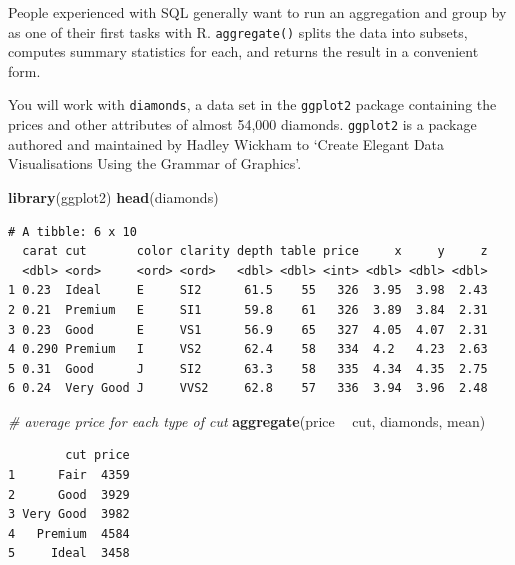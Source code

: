 \documentclass[
]{book}
\newenvironment{Shaded}{\begin{snugshade}}{\end{snugshade}}
\newcommand{\CommentTok}[1]{\textcolor[rgb]{0.56,0.35,0.01}{\textit{#1}}}
\newcommand{\KeywordTok}[1]{\textcolor[rgb]{0.13,0.29,0.53}{\textbf{#1}}}
\newcommand{\NormalTok}[1]{#1}
\newcommand{\OperatorTok}[1]{\textcolor[rgb]{0.81,0.36,0.00}{\textbf{#1}}}
\newcommand{\StringTok}[1]{\textcolor[rgb]{0.31,0.60,0.02}{#1}}
\begin{document}
People experienced with SQL generally want to run an aggregation and
group by as one of their first tasks with R. \texttt{aggregate()} splits the data into subsets, computes summary statistics for each, and returns the result in a convenient form.

You will work with \texttt{diamonds}, a data set in the \texttt{ggplot2} package containing the prices and other attributes of almost 54,000 diamonds. \texttt{ggplot2} is a package authored and maintained by Hadley Wickham to `Create Elegant Data Visualisations Using the Grammar of Graphics'.

\begin{Shaded}
\begin{Highlighting}[]
\KeywordTok{library}\NormalTok{(ggplot2)}
\KeywordTok{head}\NormalTok{(diamonds)}
\end{Highlighting}
\end{Shaded}

\begin{verbatim}
# A tibble: 6 x 10
  carat cut       color clarity depth table price     x     y     z
  <dbl> <ord>     <ord> <ord>   <dbl> <dbl> <int> <dbl> <dbl> <dbl>
1 0.23  Ideal     E     SI2      61.5    55   326  3.95  3.98  2.43
2 0.21  Premium   E     SI1      59.8    61   326  3.89  3.84  2.31
3 0.23  Good      E     VS1      56.9    65   327  4.05  4.07  2.31
4 0.290 Premium   I     VS2      62.4    58   334  4.2   4.23  2.63
5 0.31  Good      J     SI2      63.3    58   335  4.34  4.35  2.75
6 0.24  Very Good J     VVS2     62.8    57   336  3.94  3.96  2.48
\end{verbatim}

\begin{Shaded}
\begin{Highlighting}[]
\CommentTok{# average price for each type of cut}
\KeywordTok{aggregate}\NormalTok{(price }\OperatorTok{~}\StringTok{ }\NormalTok{cut, diamonds, mean)}
\end{Highlighting}
\end{Shaded}

\begin{verbatim}
        cut price
1      Fair  4359
2      Good  3929
3 Very Good  3982
4   Premium  4584
5     Ideal  3458
\end{verbatim}

\begin{Shaded}
\end{Shaded}
\end{document}
